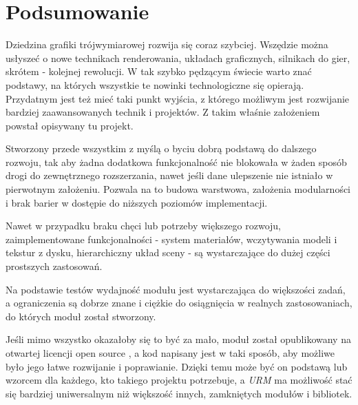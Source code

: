 \chapter{Podsumowanie}
Dziedzina grafiki trójwymiarowej rozwija się coraz szybciej. Wszędzie można usłyszeć o nowe technikach renderowania, układach graficznych, silnikach do gier, skrótem - kolejnej rewolucji. W tak szybko pędzącym świecie warto znać podstawy, na których wszystkie te nowinki technologiczne się opierają. Przydatnym jest też mieć taki punkt wyjścia, z którego możliwym jest rozwijanie bardziej zaawansowanych technik i projektów. Z takim właśnie założeniem powstał opisywany tu projekt. 

Stworzony przede wszystkim z myślą o byciu dobrą podstawą do dalszego rozwoju, tak aby żadna dodatkowa funkcjonalność nie blokowała w żaden sposób drogi do zewnętrznego rozszerzania, nawet jeśli dane ulepszenie nie istniało w pierwotnym założeniu. Pozwala na to budowa warstwowa, założenia modularności i brak barier w dostępie do niższych poziomów implementacji. 

Nawet w przypadku braku chęci lub potrzeby większego rozwoju, zaimplementowane funkcjonalności - system materiałów, wczytywania modeli i tekstur z dysku, hierarchiczny układ sceny - są wystarczające do dużej części prostszych zastosowań. 

Na podstawie testów wydajność modułu jest wystarczająca do większości zadań, a ograniczenia są dobrze znane i ciężkie do osiągnięcia w realnych zastosowaniach, do których moduł został stworzony.  

Jeśli mimo wszystko okazałoby się to być za mało, moduł został opublikowany na otwartej licencji open source \cite{GitHub:Minik:MasterThesisUniversalRenderingModuleD3D11}, a kod napisany jest w taki sposób, aby możliwe było jego łatwe rozwijanie i poprawianie. Dzięki temu może być on podstawą lub wzorcem dla każdego, kto takiego projektu potrzebuje, a \textit{URM} ma możliwość stać się bardziej uniwersalnym niż większość innych, zamkniętych modułów i bibliotek.
